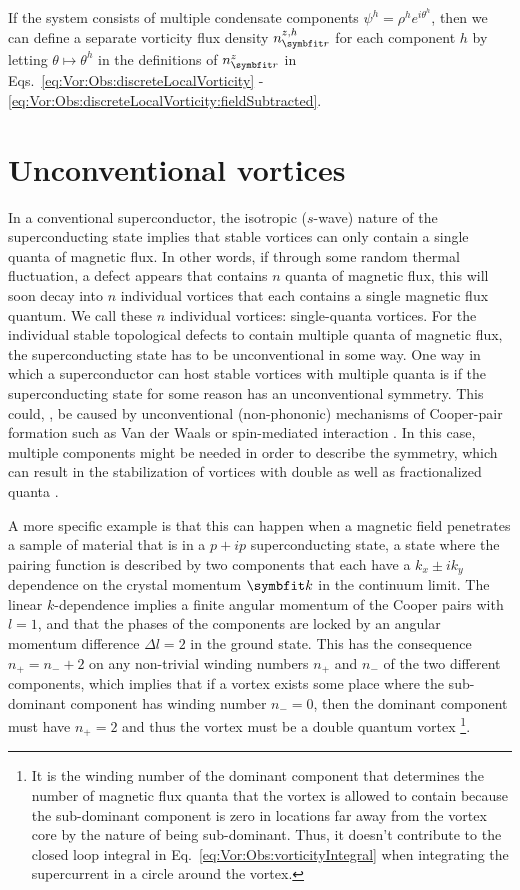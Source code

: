 If the system consists of multiple condensate components $\psi^h = \rho^he^{i\theta^h}$, then we can define a separate vorticity flux density $n^{z,h}_\v{r}$ for each component
$h$ by letting $\theta\mapsto\theta^h$ in the definitions of $n^z_\v{r}$ in Eqs.~\eqref{eq:Vor:Obs:discreteLocalVorticity} - \eqref{eq:Vor:Obs:discreteLocalVorticity:fieldSubtracted}.


\section{Unconventional vortices}
\label{sec:Vor:UnconventionalVortices}

In a conventional superconductor, the isotropic (\ie $s$-wave) nature of the superconducting state implies that stable vortices can only contain a single quanta of magnetic flux.
In other words, if through some random thermal fluctuation, a defect appears that contains $n$ quanta of magnetic flux, this will soon decay into $n$ individual vortices
that each contains a single magnetic flux quantum. We call these $n$ individual vortices: single-quanta vortices.
For the individual stable topological defects to contain
multiple quanta of magnetic flux, the superconducting state has to be unconventional in some way.
One way in which a superconductor can host stable vortices with multiple quanta is if the superconducting state for some reason has an unconventional symmetry. This could, \eg, be
caused by unconventional (\ie non-phononic) mechanisms of Cooper-pair formation such as Van der Waals or spin-mediated interaction \cite{Sigrist05}.
In this case, multiple components might be needed in order to describe the symmetry, which can result in the stabilization of vortices with double as well as fractionalized
quanta \cite{Babaev02}.

A more specific example is that this can happen when a magnetic field penetrates a sample of material that is in a $p+ip$ superconducting state, \ie a state where the
pairing function is described by two components that each have a $k_x\pm ik_y$ dependence on the crystal momentum $\v{k}$ in the continuum limit. The linear
$k$-dependence implies a finite angular momentum of the Cooper pairs with $l=1$, and that the phases of the components are locked by an angular momentum difference $\Delta l=2$
in the ground state.
This has the consequence $n_+ = n_- + 2$ on any non-trivial winding numbers $n_+$ and $n_-$ of the two different components, which implies that if a vortex exists some
place where the sub-dominant component has winding number $n_-=0$, then the dominant component must have $n_+=2$ and thus the vortex must be a double quantum vortex%
\footnote{It is the winding number of the dominant component that determines the number of magnetic flux quanta that the vortex is allowed to contain because the sub-dominant
component is zero in locations far away from the vortex core by the nature of being sub-dominant. Thus, it doesn't contribute to the closed loop integral in 
Eq.~\eqref{eq:Vor:Obs:vorticityIntegral} when integrating the supercurrent in a circle around the vortex.}.


